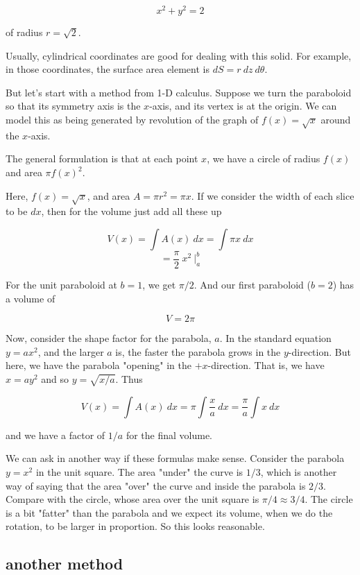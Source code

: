 \documentclass[11pt, oneside]{report}   	%
\begin{document}
\[ x^2 + y^2 = 2 \]

 of radius $r=\sqrt{2}$.

Usually, cylindrical coordinates are good for dealing with this solid.  For example, in those coordinates, the surface area element is $dS = r \ dz \ d \theta$.

But let's start with a method from 1-D calculus.  Suppose we turn the paraboloid so that its symmetry axis is the $x$-axis, and its vertex is at the origin.  We can model this as being generated by revolution of the graph of $f(x) = \sqrt{x}$ around the $x$-axis.

The general formulation is that at each point $x$, we have a circle of radius $f(x)$ and area $\pi f(x)^2$.

Here, $f(x)=\sqrt{x}$, and area $A = \pi r^2 = \pi x$.  If we consider the width of each slice to be $dx$, then for the volume just add all these up

\[ V(x) = \int A(x) \ dx = \int \pi x \ dx \]
\[ = \frac{\pi}{2} \ x^2 \ \bigg |_a^b \]

For the unit paraboloid at $b=1$, we get $\pi/2$.  And our first paraboloid ($b=2$) has a volume of 

\[ V = 2 \pi \]

Now, consider the shape factor for the parabola, $a$.  In the standard equation $y=ax^2$, and the larger $a$ is, the faster the parabola grows in the $y$-direction.  But here, we have the parabola "opening" in the $+x$-direction.  That is, we have $x = a y^2$ and so $y= \sqrt{x/a}$.  Thus

\[ V(x) = \int A(x) \ dx = \pi \int \frac{x}{a} \ dx =  \frac{\pi}{a} \int x \ dx \]

and we have a factor of $1/a$ for the final volume.  

We can ask in another way if these formulas make sense.  Consider the parabola $y=x^2$ in the unit square.  The area "under" the curve is $1/3$, which is another way of saying that the area "over" the curve and inside the parabola is $2/3$.  Compare with the circle, whose area over the unit square is $\pi/4 \approx 3/4$.  The circle is a bit "fatter" than the parabola and we expect its volume, when we do the rotation, to be larger in proportion.  So this looks reasonable.

\subsection*{another method}
\end{document}
